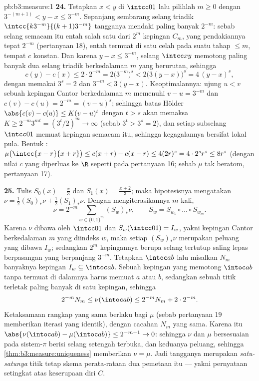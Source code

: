 \begin{solution}{pb:b3:measure:1}
\textbf{24.} Tetapkan $x < y$ di $\intcc01$ lalu pilihlah $m \geq 0$
dengan $3^{-(m+1)} < y - x \leq 3^{-m}$. Sepanjang sembarang selang
triadik $\intcc{k3^{-m}}{(k+1)3^{-m}}$ tangganya mendaki
paling banyak $2^{-m}$: sebab selang semacam itu entah salah satu dari $2^m$
kepingan $C_m$, yang pendakiannya tepat $2^{-m}$ (pertanyaan
18), entah termuat di  satu celah pada suatu
tahap $\leq m$, tempat $c$ konstan. Dan karena $y - x \leq
3^{-m}$, selang $\intcc xy$ memotong paling banyak dua
selang triadik berkedalaman $m$ yang berurutan, sehingga
\[
c(y) - c(x) \leq 2\cdot2^{-m}
= 2\bigl(3^{-m}\bigr)^{s}
< 2\bigl(3(y - x)\bigr)^{s}
= 4\,(y - x)^{s},
\]
dengan memakai $3^{s} = 2$ dan $3^{-m} < 3(y - x)$. Keoptimalannya:
ujung $u < v$ sebuah kepingan Cantor berkedalaman $m$ memenuhi $v - u =
3^{-m}$ dan $c(v) - c(u) = 2^{-m} = (v - u)^{s}$; sehingga batas Hölder
$\abs{c(v) - c(u)} \leq K(v - u)^{t}$ dengan $t > s$ akan
memaksa $K \geq 2^{-m}3^{mt} = (3^{t}/2)^{m} \to \infty$ (sebab
$3^{t} > 3^{s} = 2$), dan setiap subselang $\intcc01$
memuat kepingan semacam itu, sehingga kegagalannya bersifat lokal pula.
Bentuk : $\mu\bigl(\intcc{x-r}{x+r}\bigr) \leq
c(x + r) - c(x - r) \leq 4(2r)^{s} = 4\cdot2^{s}r^{s} \leq
8r^{s}$ (dengan nilai $c$ yang diperluas ke $\R$ seperti pada pertanyaan 16;
sebab $\mu$ tak beratom, pertanyaan 17).

\textbf{25.} Tulis $S_0(x) = \frac x3$ dan $S_1(x) =
\frac{x+2}3$; maka hipotesisnya mengatakan $\nu = \frac12(S_0)_*\nu +
\frac12(S_1)_*\nu$. Dengan mengiterasikannya $m$ kali,
\[
\nu = 2^{-m}\sum_{w \in \{0,1\}^m}(S_w)_*\nu,
\qquad S_w = S_{w_1}\circ\dots\circ S_{w_m}.
\]
Karena $\nu$ dibawa oleh $\intcc01$ dan $S_w(\intcc01) =
I_w$, yakni kepingan Cantor berkedalaman $m$ yang diindeks $w$, maka setiap
$(S_w)_*\nu$ merupakan  peluang yang dibawa $I_w$; sedangkan
$2^m$ kepingannya berupa selang tertutup saling lepas berpasangan yang berpanjang
$3^{-m}$. Tetapkan $\intoc ab$ lalu misalkan $N_m$ banyaknya
kepingan $I_w \subseteq \intoc ab$. Sebuah kepingan yang memotong $\intoc ab$
tanpa termuat di dalamnya harus memuat $a$ atau $b$, sedangkan sebuah
titik terletak paling banyak di satu kepingan, sehingga
\[
2^{-m}N_m \leq \nu(\intoc ab) \leq 2^{-m}N_m + 2\cdot2^{-m}.
\]
Ketaksamaan rangkap yang sama berlaku bagi $\mu$ (sebab pertanyaan 19 memberikan
iterasi yang identik), dengan cacahan $N_m$ yang sama. Karena itu
$\abs{\nu(\intoc ab) - \mu(\intoc ab)} \leq 2^{-m+1} \to 0$:
sehingga $\nu$ dan $\mu$ bersesuaian pada sistem-$\pi$ berisi selang setengah
terbuka, dan keduanya  peluang, sehingga
\cref{thm:b3:measure:uniqueness} memberikan $\nu = \mu$. Jadi
 tangganya merupakan \emph{satu-satunya} titik tetap
skema perata-rataan dua pemetaan itu --- yakni pernyataan setingkat  atas
keserupaan diri $C$.

\end{solution}
